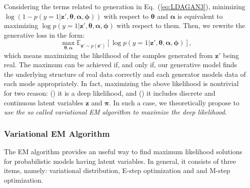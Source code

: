 \documentclass{article}
\begin{document}
Considering the terms related to generation in Eq.~(\ref{eq:LDAGAN3}), minimizing $\log\left(1-p\left(y=1|\mathbf{z}',\bm{\theta},\bm{\alpha}, \bm{\phi}\right)\right)$ with respect to $\bm{\theta}$ and $\bm{\alpha}$ is equivalent to maximizing $\log p\left(y=1|\mathbf{z}',\bm{\theta},\bm{\alpha}, \bm{\phi}\right)$ with respect to them.
Then, we rewrite the generative loss in the form:
\begin{equation}
\max_{\bm{\theta},\bm{\alpha}}
\mathbb{E}_{\mathbf{z}' \sim p \left( \mathbf{z}' \right)}
\left[ \log p\left( y=1 | \mathbf{z}',\bm{\theta},\bm{\alpha}, \bm{\phi} \right) \right],
\label{eq:Learning-G1}
\end{equation}
which means maximizing the likelihood of the samples generated from $\mathbf{z}'$ being real.
The maximum can be achieved if, and only if, our generative model finds the underlying structure of real data correctly and each generator models data of each mode appropriately.
In fact, maximizing the above likelihood is nontrivial for two reason:
() it is a deep likelihood, and
() it includes discrete and continuous latent variables $\mathbf{z}$ and $\bm{\pi}$.
In such a case, we theoretically propose to \emph{use the so called variational EM algorithm to maximize the deep likelihood}.



\subsubsection{Variational EM Algorithm}
\label{sec:EM}

The EM algorithm provides an useful way to find maximum likelihood solutions for probabilistic models having latent variables.
In general, it consists of three items, namely: variational distribution, E-step optimization and and M-step optimization.
\end{document}
